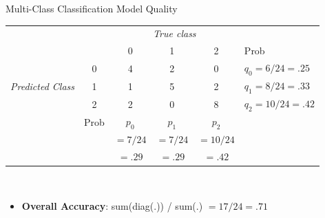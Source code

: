 \documentclass[ignorenonframetext,xcolor=x11names]{beamer}
\begin{document}
 
\begin{frame}[label=full]{Multi-Class Classification Model Quality}
\begin{block}{}
\small
\begin{center}
\renewcommand{\arraystretch}{1.25}

\begin{tabular}{cc|ccc|l} \hline
     & & \multicolumn{3}{c|}{\emph{True class}} \\
                 &   & 0 & 1 & 2 & Prob \\ \hline
\multirow{3}{1.1cm}{\emph{Predicted Class}} & 0 & 4 & 2 & 0 & $q_0 = 6/24  = .25$ \\ 
                 & 1 & 1 & 5 & 2 & $q_1 = 8/24  = .33$ \\
                 & 2 & 2 & 0 & 8 & $q_2 = 10/24 = .42$ \\ \hline
     & Prob & $p_0$ & $p_1$ & $p_2$ &  \\
     &      & $=7/24$ & $=7/24$ & $=10/24$ &  \\ 
     &      & $=.29$ & $=.29$ & $=.42$ &  \\ \hline
\end{tabular} \\
\end{center}
\end{block}
\begin{itemize}
   \item \textbf{Overall Accuracy}: sum(diag(.)) / sum(.) $=17/24=.71$
\end{itemize}
\end{frame}
\end{document}
